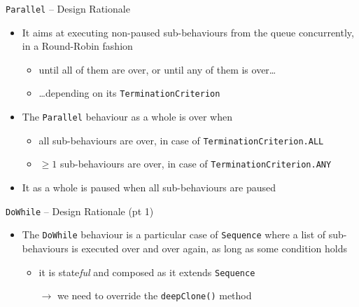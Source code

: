 \documentclass[presentation]{beamer}\mode<presentation>{\usetheme{AMSCesenaPurpleAndGold}}
\begin{document}
\begin{frame}[c, allowframebreaks]
\begin{exampleblock}{\texttt{Parallel} -- Design Rationale}
\begin{itemize}
            \smallskip

            \item It aims at executing non-paused sub-behaviours from the queue concurrently, in a \alert{Round-Robin} fashion
            \begin{itemize}
                \item until \alert{all} of them are over, or until \alert{any} of them is over\ldots
                \item \ldots depending on its \alert{\texttt{TerminationCriterion}}
            \end{itemize}

            \smallskip

            \item The \texttt{Parallel} behaviour as a whole is \alert{over} when
            \begin{itemize}
                \item all sub-behaviours are over, in case of \texttt{TerminationCriterion.\alert{ALL}}
                \item $\geq 1$ sub-behaviours are over, in case of \texttt{TerminationCriterion.\alert{ANY}}
            \end{itemize}

            \smallskip

            \item It as a whole is \alert{paused} when all sub-behaviours are paused

        \end{itemize}
    \end{exampleblock}

    \begin{exampleblock}{\texttt{DoWhile} -- Design Rationale (pt 1)}
        \begin{itemize}
            \item The \texttt{DoWhile} behaviour is a particular case of \texttt{Sequence} where a list of sub-behaviours is executed over and over again, as long as some \alert{condition} holds
            \begin{itemize}
                \item it is \alert{state\emph{ful}} and \alert{composed} as it extends \texttt{Sequence}
                \item[$\rightarrow$] we need to override the \texttt{\alert{deepClone()}} method
            \end{itemize}


\end{itemize}
\end{exampleblock}
\end{frame}
\end{document}
